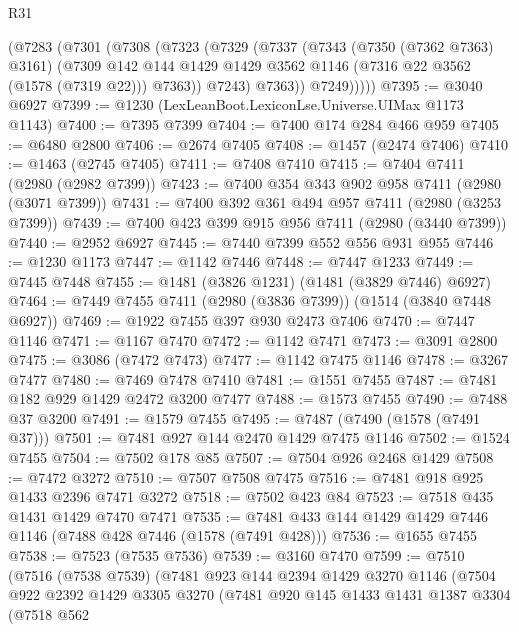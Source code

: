 \begin{lexlean}{R31}
\begin{coremodule}
        (@7283
          (@7301
            (@7308
              (@7323
                (@7329
                  (@7337
                    (@7343
                      (@7350 (@7362 @7363) @3161)
                      (@7309
                        @142
                        @144
                        @1429
                        @1429
                        @3562
                        @1146
                        (@7316 @22 @3562 (@1578 (@7319 @22)))
                        @7363))
                    @7243)
                  @7363))
              @7249)))))
@7395 := @3040 @6927
@7399 := @1230 (LexLeanBoot.LexiconLse.Universe.UIMax @1173 @1143)
@7400 := @7395 @7399
@7404 := @7400 @174 @284 @466 @959
@7405 := @6480 @2800
@7406 := @2674 @7405
@7408 := @1457 (@2474 @7406)
@7410 := @1463 (@2745 @7405)
@7411 := @7408 @7410
@7415 := @7404 @7411 (@2980 (@2982 @7399))
@7423 := @7400 @354 @343 @902 @958 @7411 (@2980 (@3071 @7399))
@7431 := @7400 @392 @361 @494 @957 @7411 (@2980 (@3253 @7399))
@7439 := @7400 @423 @399 @915 @956 @7411 (@2980 (@3440 @7399))
@7440 := @2952 @6927
@7445 := @7440 @7399 @552 @556 @931 @955
@7446 := @1230 @1173
@7447 := @1142 @7446
@7448 := @7447 @1233
@7449 := @7445 @7448
@7455 := @1481 (@3826 @1231) (@1481 (@3829 @7446) @6927)
@7464 := @7449 @7455 @7411 (@2980 (@3836 @7399)) (@1514 (@3840 @7448 @6927))
@7469 := @1922 @7455 @397 @930 @2473 @7406
@7470 := @7447 @1146
@7471 := @1167 @7470
@7472 := @1142 @7471
@7473 := @3091 @2800
@7475 := @3086 (@7472 @7473)
@7477 := @1142 @7475 @1146
@7478 := @3267 @7477
@7480 := @7469 @7478 @7410
@7481 := @1551 @7455
@7487 := @7481 @182 @929 @1429 @2472 @3200 @7477
@7488 := @1573 @7455
@7490 := @7488 @37 @3200
@7491 := @1579 @7455
@7495 := @7487 (@7490 (@1578 (@7491 @37)))
@7501 := @7481 @927 @144 @2470 @1429 @7475 @1146
@7502 := @1524 @7455
@7504 := @7502 @178 @85
@7507 := @7504 @926 @2468 @1429
@7508 := @7472 @3272
@7510 := @7507 @7508 @7475
@7516 := @7481 @918 @925 @1433 @2396 @7471 @3272
@7518 := @7502 @423 @84
@7523 := @7518 @435 @1431 @1429 @7470 @7471
@7535 := @7481 @433 @144 @1429 @1429 @7446 @1146 (@7488 @428 @7446 (@1578 (@7491 @428)))
@7536 := @1655 @7455
@7538 := @7523 (@7535 @7536)
@7539 := @3160 @7470
@7599 := @7510
    (@7516
      (@7538 @7539)
      (@7481
        @923
        @144
        @2394
        @1429
        @3270
        @1146
        (@7504
          @922
          @2392
          @1429
          @3305
          @3270
          (@7481
            @920
            @145
            @1433
            @1431
            @1387
            @3304
            (@7518
              @562

\end{coremodule}
\end{lexlean}
